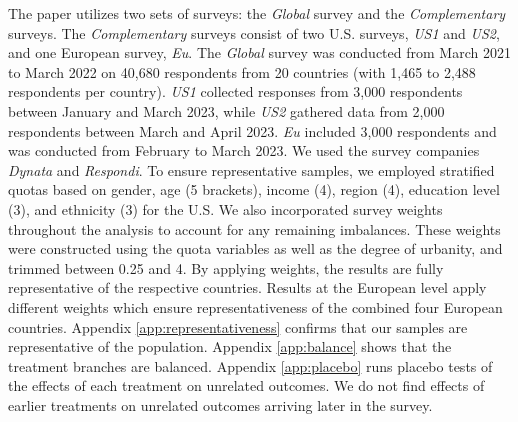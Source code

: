 \begin{small}
The paper utilizes two sets of surveys: the \textit{Global} survey and the \textit{Complementary} surveys. The \textit{Complementary} surveys consist of two U.S. surveys, \textit{US1} and \textit{US2}, and one European survey, \textit{Eu}. The \textit{Global} survey was conducted from March 2021 to March 2022 on 40,680 respondents from 20 countries (with 1,465 to 2,488 respondents per country). \textit{US1} collected responses from 3,000 respondents between January and March 2023, while \textit{US2} gathered data from 2,000 respondents between March and April 2023. \textit{Eu} included 3,000 respondents and was conducted from February to March 2023. We used the survey companies \emph{Dynata} and \emph{Respondi}. To ensure representative samples, we employed stratified quotas based on gender, age (5 brackets), income (4), region (4), education level (3), and ethnicity (3) for the U.S. We also incorporated survey weights throughout the analysis to account for any remaining imbalances. These weights were constructed using the quota variables as well as the degree of urbanity, and trimmed between 0.25 and 4. By applying weights, the results are fully representative of the respective countries. Results at the European level apply different weights which ensure  representativeness of the combined four European countries. Appendix \ref{app:representativeness} confirms that our samples are representative of the population. %
Appendix \ref{app:balance} shows that the treatment branches are balanced. Appendix \ref{app:placebo} runs placebo tests of the effects of each treatment on unrelated outcomes. We do not find effects of earlier treatments on unrelated outcomes arriving later in the survey.



\end{small}
